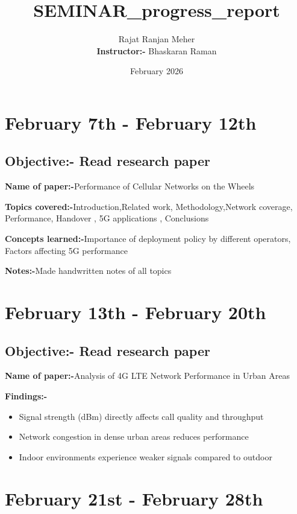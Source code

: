\documentclass{article}
\title{SEMINAR\_progress\_report}
\author{Rajat Ranjan Meher\\[0.2cm]
\textbf{Instructor:-} Bhaskaran Raman\\[0.2cm]}
\date{February 2026}
\begin{document}
\maketitle



\section{February 7th - February 12th}
\subsection{Objective:- Read research paper }\par
\textbf{Name of paper:-}Performance of Cellular Networks on the Wheels\par
\vspace{2mm}
\textbf{Topics covered:-}Introduction,Related work, Methodology,Network coverage, Performance, Handover , 5G applications , Conclusions\par
\vspace{2mm}
\textbf{Concepts learned:-}Importance of deployment policy by different operators, Factors affecting 5G performance\par
\vspace{2mm}
\textbf{Notes:-}Made handwritten notes of all topics\par 
\section{February 13th - February 20th}
\subsection{Objective:- Read research paper }\par
\textbf{Name of paper:-}Analysis of 4G LTE Network Performance in Urban Areas\par
\vspace{2mm}
\textbf{Findings:-}
\begin{itemize}
\item Signal strength (dBm) directly affects call quality and throughput
\item Network congestion in dense urban areas reduces performance
\item Indoor environments experience weaker signals compared to outdoor
\end{itemize}


\section{February 21st - February 28th}
\end{document}
